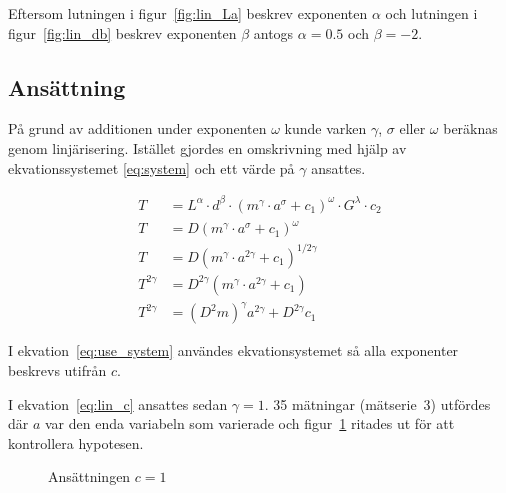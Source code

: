 \documentclass[a4paper,12pt]{article}
\begin{document}
Eftersom lutningen i figur~\ref{fig:lin_La} beskrev exponenten $\alpha$ och
lutningen i figur~\ref{fig:lin_db} beskrev exponenten $\beta$ antogs $\alpha =
0.5$ och $\beta = -2$.

\subsection{Ansättning}

På grund av additionen under exponenten $\omega$ kunde varken $\gamma$, $\sigma$ eller $\omega$
beräknas genom linjärisering. Istället gjordes en omskrivning med hjälp av
ekvationssystemet \eqref{eq:system} och ett värde på $\gamma$ ansattes.

\begin{align}
  T &= L^\alpha \cdot d^\beta \cdot (m^\gamma \cdot a^\sigma + c_1)^\omega \cdot G^\lambda  \cdot c_2\nonumber \\
  T &= D (m^\gamma \cdot a^\sigma + c_1)^\omega \nonumber \\
  T &= D (m^\gamma \cdot a^{2\gamma} + c_1)^{1/2\gamma} \label{eq:use_system} \\
  T^{2\gamma} &= D^{2\gamma} (m^\gamma \cdot a^{2\gamma} + c_1) \nonumber \\
  T^{2\gamma} &= (D^2m)^\gamma a^{2\gamma} + D^{2\gamma}c_1 \label{eq:lin_c}
\end{align}

I ekvation~\eqref{eq:use_system} användes ekvationsystemet så alla exponenter
beskrevs utifrån $c$.

I ekvation~\eqref{eq:lin_c} ansattes sedan $\gamma = 1$. 35 mätningar (mätserie~3)
utfördes där $a$ var den enda variabeln som varierade och figur~\ref{fig:lin_c}
ritades ut för att kontrollera hypotesen.

\begin{figure}[h!]
  \caption{Ansättningen $c = 1$}
  \label{fig:lin_c}
\end{figure}
\end{document}
